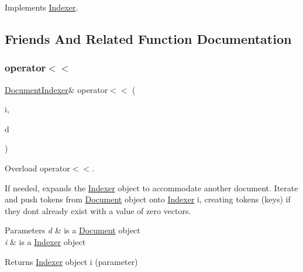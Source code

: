 Implements \hyperlink{class_indexer_a8301fcbdf40afd926ab71d4767575d32}{Indexer}.



\subsection{Friends And Related Function Documentation}
\mbox{\label{class_document_indexer_a6c2e084b73080867237d1637bc040d66}} 
\subsubsection{\texorpdfstring{operator$<$$<$}{operator<<}\hspace{0.1cm}{\footnotesize\ttfamily [1/4]}}
{\footnotesize\ttfamily \hyperlink{class_document_indexer}{Document\+Indexer}\& operator$<$$<$ (\begin{DoxyParamCaption}\item[{\hyperlink{class_document_indexer}{Document\+Indexer} \&}]{i,  }\item[{const \hyperlink{class_document}{Document} \&}]{d }\end{DoxyParamCaption})\hspace{0.3cm}{\ttfamily [friend]}}



Overload operator$<$$<$. 

If needed, expands the \hyperlink{class_indexer}{Indexer} object to accommodate another document. Iterate and push tokens from \hyperlink{class_document}{Document} object onto \hyperlink{class_indexer}{Indexer} i, creating tokens (keys) if they don\textquotesingle{}t already exist with a value of zero vectors.


\begin{DoxyParams}{Parameters}
{\em d} & is a \hyperlink{class_document}{Document} object \\
\hline
{\em i} & is a \hyperlink{class_indexer}{Indexer} object \\
\hline
\end{DoxyParams}
\begin{DoxyReturn}{Returns}
\hyperlink{class_indexer}{Indexer} object i (parameter) 
\end{DoxyReturn}
\mbox{\label{class_document_indexer_a82199a005a825421b7db05a3c2547180}} 
